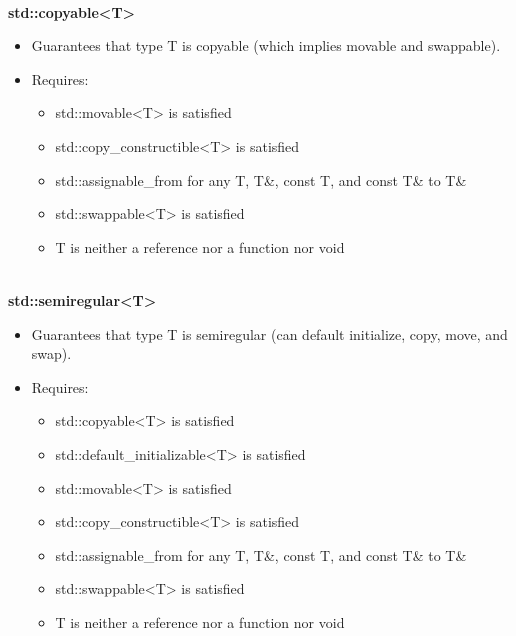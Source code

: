 \noindent
\hspace*{\fill} \\ %
\textbf{std::copyable<T>}

\begin{itemize}
\item
Guarantees that type T is copyable (which implies movable and swappable).

\item
Requires:
\begin{itemize}
\item
std::movable<T> is satisfied

\item
std::copy\_constructible<T> is satisfied

\item
std::assignable\_from for any T, T\&, const T, and const T\& to T\&

\item
std::swappable<T> is satisfied

\item
T is neither a reference nor a function nor void
\end{itemize}
\end{itemize}

\noindent
\hspace*{\fill} \\ %
\textbf{std::semiregular<T>}

\begin{itemize}
\item
Guarantees that type T is semiregular (can default initialize, copy, move, and swap).

\item
Requires:
\begin{itemize}
\item
std::copyable<T> is satisfied

\item
std::default\_initializable<T> is satisfied

\item
std::movable<T> is satisfied

\item
std::copy\_constructible<T> is satisfied

\item
std::assignable\_from for any T, T\&, const T, and const T\& to T\&

\item
std::swappable<T> is satisfied

\item
T is neither a reference nor a function nor void
\end{itemize}
\end{itemize}

